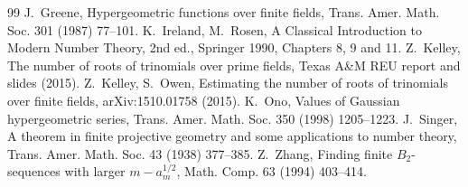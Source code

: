\documentclass[11pt]{article}
\begin{document}
\begin{thebibliography}{99}
 J.~Greene, Hypergeometric functions over finite fields, Trans. Amer. Math. Soc. 301 (1987) 77--101.
 K.~Ireland, M.~Rosen, A Classical Introduction to Modern Number Theory, 2nd ed., Springer 1990, Chapters 8, 9 and 11.
 Z.~Kelley, The number of roots of trinomials over prime fields, Texas A\&M REU report and slides (2015).
 Z.~Kelley, S.~Owen, Estimating the number of roots of trinomials over finite fields, arXiv:1510.01758 (2015).
 K.~Ono, Values of Gaussian hypergeometric series, Trans. Amer. Math. Soc. 350 (1998) 1205--1223.
 J.~Singer, A theorem in finite projective geometry and some applications to number theory, Trans. Amer. Math. Soc. 43 (1938) 377--385.
 Z.~Zhang, Finding finite $B_2$-sequences with larger $m-a_m^{1/2}$, Math. Comp. 63 (1994) 403--414.
\end{thebibliography}
\end{document}
